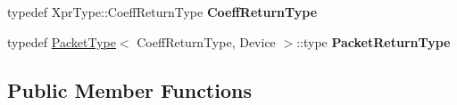 \begin{DoxyCompactItemize}
typedef Xpr\+Type\+::\+Coeff\+Return\+Type {\bfseries Coeff\+Return\+Type}
\item 
\mbox{\label{struct_eigen_1_1_tensor_evaluator_3_01_tensor_concatenation_op_3_01_axis_00_01_left_arg_type_00_7f27325ca3102a6730769e76427d2ca7_a79405d51674d412dccbcbcd33eb0bbcc}} 
typedef \hyperlink{struct_eigen_1_1_packet_type}{Packet\+Type}$<$ Coeff\+Return\+Type, Device $>$\+::type {\bfseries Packet\+Return\+Type}
\end{DoxyCompactItemize}
\subsection*{Public Member Functions}
